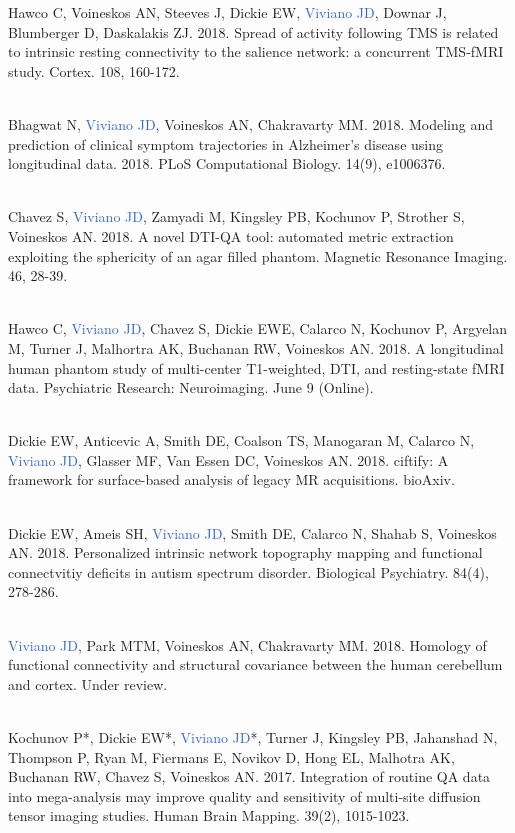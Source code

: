 \documentclass[a4paper,11pt,oneside]{book}
\begin{document}
\begin{flushleft}
Hawco C, Voineskos AN,  Steeves J, Dickie EW, \textcolor{highlight}{Viviano JD}, Downar J, Blumberger D, Daskalakis ZJ. 2018. Spread of activity following TMS is related to intrinsic resting connectivity to the salience network: a concurrent TMS-fMRI study. Cortex. 108, 160-172. \\\

Bhagwat N, \textcolor{highlight}{Viviano JD}, Voineskos AN, Chakravarty MM. 2018. Modeling and prediction of clinical symptom trajectories in Alzheimer's disease using longitudinal data. 2018. PLoS Computational Biology. 14(9), e1006376. \\\

Chavez S, \textcolor{highlight}{Viviano JD}, Zamyadi M, Kingsley PB, Kochunov P, Strother S, Voineskos AN. 2018. A novel DTI-QA tool: automated metric extraction exploiting the sphericity of an agar filled phantom. Magnetic Resonance Imaging. 46, 28-39. \\\

Hawco C, \textcolor{highlight}{Viviano JD}, Chavez S, Dickie EWE, Calarco N, Kochunov P, Argyelan M, Turner J, Malhortra AK, Buchanan RW, Voineskos AN. 2018. A longitudinal human phantom study of multi-center T1-weighted, DTI, and resting-state fMRI data. Psychiatric Research: Neuroimaging. June 9 (Online).  \\\

Dickie EW, Anticevic A, Smith DE, Coalson TS, Manogaran M, Calarco N, \textcolor{highlight}{Viviano JD}, Glasser MF, Van Essen DC, Voineskos AN. 2018. ciftify: A framework for surface-based analysis of legacy MR acquisitions. bioAxiv. \\\

Dickie EW, Ameis SH, \textcolor{highlight}{Viviano JD}, Smith DE, Calarco N, Shahab S, Voineskos AN. 2018. Personalized intrinsic network topography mapping and functional connectvitiy deficits in autism spectrum disorder. Biological Psychiatry. 84(4), 278-286. \\\

\textcolor{highlight}{Viviano JD}, Park MTM, Voineskos AN, Chakravarty MM. 2018. Homology of functional connectivity and structural covariance between the human cerebellum and cortex. Under review. \\\

Kochunov P*, Dickie EW*, \textcolor{highlight}{Viviano JD}*, Turner J, Kingsley PB, Jahanshad N, Thompson P, Ryan M, Fiermans E, Novikov D, Hong EL, Malhotra AK, Buchanan RW, Chavez S, Voineskos AN. 2017. Integration of routine QA data into mega-analysis may improve quality and sensitivity of multi-site diffusion tensor imaging studies. Human Brain Mapping. 39(2), 1015-1023. \\\


\end{flushleft}
\end{document}
